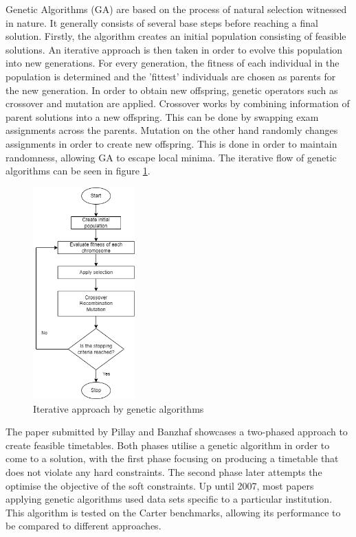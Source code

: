 Genetic Algorithms (GA) are based on the process of natural selection witnessed in nature. It generally consists of several base steps before reaching a final solution. Firstly, the algorithm creates an initial population consisting of feasible solutions. An iterative approach is then taken in order to evolve this population into new generations. For every generation, the fitness of each individual in the population is determined and the 'fittest' individuals are chosen as parents for the new generation. In order to obtain new offspring, genetic operators such as crossover and mutation are applied. Crossover works by combining information of parent solutions into a new offspring. This can be done by swapping exam assignments across the parents. Mutation on the other hand randomly changes assignments in order to create new offspring. This is done in order to maintain randomness, allowing GA to escape local minima. The iterative flow of genetic algorithms can be seen in figure \ref{fig:GA}.

\begin{figure}[h]
	\centering
	\includegraphics[width=0.35\textwidth]{images/related_works/GA/GA.png} 
	\caption{Iterative approach by genetic algorithms}
	\label{fig:GA}
\end{figure}


The paper submitted by Pillay and Banzhaf \cite{pillay2010} showcases a two-phased approach to create feasible timetables. Both phases utilise a genetic algorithm in order to come to a solution, with the first phase focusing on producing a timetable that does not violate any hard constraints. The second phase later attempts the optimise the objective of the soft constraints. Up until 2007, most papers applying genetic algorithms used data sets specific to a particular institution. This algorithm is tested on the Carter benchmarks, allowing its performance to be compared to different approaches.

